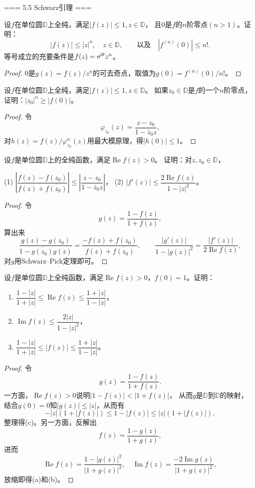 === 5.5 Schwarz引理 ===
\begin{1}
    设$f$在单位圆$\mathbb{D}$上全纯，满足$|f(z)|\le1,z\in\mathbb{D}$，
    且$0$是$f$的$n$阶零点$(n>1)$。证明：
    \[|f(z)|\le|z|^n,\quad z\in\mathbb{D},\qquad\text{以及}\quad|f^{(n)}(0)|\le n!.\]
    等号成立的充要条件是$f(z)={\rm e}^{{\rm i}\theta}z^n$。
\end{1}
\begin{proof}
    $0$是$g(z)=f(z)/z^n$的可去奇点，取值为$g(0)=f^{(n)}(0)/n!$。
\end{proof}
\begin{2}
    设$f$在单位圆$\mathbb{D}$上全纯，满足$|f(z)|\le1,z\in\mathbb{D}$。
    如果$z_0\in\mathbb{D}$是$f$的一个$n$阶零点，证明：$|z_0|^n\ge|f(0)|$。
\end{2}
\begin{proof}
    令\[\varphi_{z_0}(z)=\frac{z-z_0}{1-\bar{z}_0z},\]
    对$h(z)=f(z)/\varphi_{z_0}^n(z)$用最大模原理，得$|h(0)|\le1$。
\end{proof}
\begin{3}
    设$f$是单位圆$\mathbb{D}$上的全纯函数，满足$\operatorname{Re}f(z)>0$。
    证明：对$z,z_0\in\mathbb{D}$，

    (1) $\left|\dfrac{f(z)-f(z_0)}{f(z)+\overline{f(z_0)}}\right|
    \le\left|\dfrac{z-z_0}{1-\bar{z}_0z}\right|$，\quad
    (2) $|f'(z)|\le\dfrac{2\operatorname{Re}f(z)}{1-|z|^2}$。
\end{3}
\begin{proof}
    令\[g(z)=\frac{1-f(z)}{1+f(z)},\]
    算出来\[\frac{g(z)-g(z_0)}{1-\overline{g(z_0)}g(z)}
    =\frac{-f(z)+f(z_0)}{f(z)+\overline{f(z_0)}},\qquad
    \frac{|g'(z)|}{1-|g(z)|^2}=\frac{|f'(z)|}{2\operatorname{Re}f(z)},\]
    对$g$用Schwarz--Pick定理即可。
\end{proof}
\begin{4}
    设$f$是单位圆$\mathbb{D}$上全纯函数，满足$\operatorname{Re}f(z)>0$，$f(0)=1$。证明：
\begin{enumerate}[label=(\alph*)]
    \item $\dfrac{1-|z|}{1+|z|}\le\operatorname{Re}f(z)\le\dfrac{1+|z|}{1-|z|}$，
    \item $\operatorname{Im}f(z)\le\dfrac{2|z|}{1-|z|^2}$，
    \item $\dfrac{1-|z|}{1+|z|}\le|f(z)|\le\dfrac{1+|z|}{1-|z|}$。
\end{enumerate}
\end{4}
\begin{proof}
    令\[g(z)=\frac{1-f(z)}{1+f(z)}.\]
    一方面，$\operatorname{Re}f(z)>0$说明$|1-f(z)|<|1+f(z)|$，
    从而$g$是$\mathbb{D}$到$\mathbb{D}$的映射，
    结合$g(0)=0$知$|g(z)|\le|z|$，从而有
    \[-|z|(1+|f(z)|)\le1-|f(z)|\le|z|(1+|f(z)|),\]
    整理得(c)。另一方面，反解出
    \[f(z)=\frac{1-g(z)}{1+g(z)},\]
    进而\[\operatorname{Re}f(z)=\frac{1-|g(z)|^2}{|1+g(z)|^2},
    \quad\operatorname{Im}f(z)=\frac{-2\operatorname{Im}g(z)}{|1+g(z)|^2},\]
    放缩即得(a)和(b)。
\end{proof}
